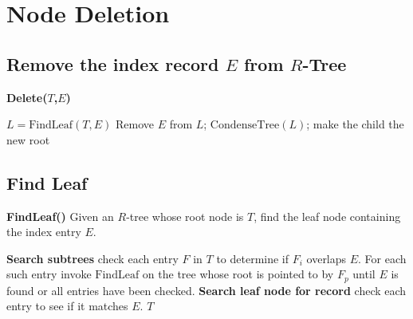 \documentclass[a4paper, 10pt, titlepage]{report}
\begin{document}
\section{Node Deletion}
\subsection{Remove the index record $E$ from $R$-Tree}
    \textbf{Delete($T$,$E$)}
        \begin{algorithm}[H]
    \caption{Delete}
    \begin{algorithmic}[1]
        \State $L = \text{FindLeaf}(T, E)$
            \State Remove $E$ from $L$;
            \State $\text{CondenseTree}(L)$;
        \EndIf
            \State make the child the new root
        \EndIf
    \EndProcedure
    \end{algorithmic}
    \end{algorithm}
\subsection{Find Leaf}
\textbf{FindLeaf()} Given an $R$-tree whose root node is $T$, find the leaf node containing the index entry $E$.
    \begin{algorithm}[H]
    \caption{FindLeaf}
    \begin{algorithmic}[1]
        \State \textbf{Search subtrees}
            \State check each entry $F$ in $T$ to determine if $F_i$ overlaps $E$.
            \State For each such entry invoke $\text{FindLeaf}$ on the tree whose root is pointed to by $F_p$ until $E$ is found or all entries have been checked.
        \EndIf
        \State \textbf{Search leaf node for record}
            \State check each entry to see if it matches $E$.
                \State \Return $T$
            \EndIf
        \EndIf
    \EndProcedure
    \end{algorithmic}
    \end{algorithm}
\end{document}
